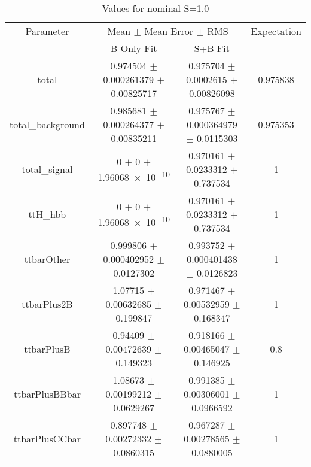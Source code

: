 \begin{table}
\centering
\caption{Values for nominal S=1.0}
\begin{tabular}{cccc}
\toprule
Parameter & \multicolumn{2}{c}{Mean $\pm$ Mean Error $\pm$ RMS} & Expectation\\
 & B-Only Fit & S+B Fit & \\
\midrule
total & \num{0.974504} $\pm$ \num{0.000261379} $\pm$ \num{0.00825717} & \num{0.975704} $\pm$ \num{0.0002615} $\pm$ \num{0.00826098} & \num{0.975838}\\
total\_background & \num{0.985681} $\pm$ \num{0.000264377} $\pm$ \num{0.00835211} & \num{0.975767} $\pm$ \num{0.000364979} $\pm$ \num{0.0115303} & \num{0.975353}\\
total\_signal & \num{0} $\pm$ \num{0} $\pm$ \num{1.96068e-10} & \num{0.970161} $\pm$ \num{0.0233312} $\pm$ \num{0.737534} & \num{1}\\
ttH\_hbb & \num{0} $\pm$ \num{0} $\pm$ \num{1.96068e-10} & \num{0.970161} $\pm$ \num{0.0233312} $\pm$ \num{0.737534} & \num{1}\\
ttbarOther & \num{0.999806} $\pm$ \num{0.000402952} $\pm$ \num{0.0127302} & \num{0.993752} $\pm$ \num{0.000401438} $\pm$ \num{0.0126823} & \num{1}\\
ttbarPlus2B & \num{1.07715} $\pm$ \num{0.00632685} $\pm$ \num{0.199847} & \num{0.971467} $\pm$ \num{0.00532959} $\pm$ \num{0.168347} & \num{1}\\
ttbarPlusB & \num{0.94409} $\pm$ \num{0.00472639} $\pm$ \num{0.149323} & \num{0.918166} $\pm$ \num{0.00465047} $\pm$ \num{0.146925} & \num{0.8}\\
ttbarPlusBBbar & \num{1.08673} $\pm$ \num{0.00199212} $\pm$ \num{0.0629267} & \num{0.991385} $\pm$ \num{0.00306001} $\pm$ \num{0.0966592} & \num{1}\\
ttbarPlusCCbar & \num{0.897748} $\pm$ \num{0.00272332} $\pm$ \num{0.0860315} & \num{0.967287} $\pm$ \num{0.00278565} $\pm$ \num{0.0880005} & \num{1}\\
\bottomrule
\end{tabular}
\end{table}